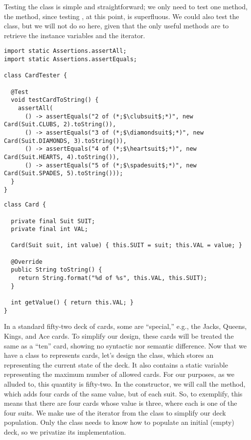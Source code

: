 Testing the  class is simple and straightforward; we only need to test one method, the  method, since testing , at this point, is superfluous. We could also test the  class, but we will not do so here, given that the only useful methods are to retrieve the instance variables and the iterator.

\begin{lstlisting}[language=MyJava]
import static Assertions.assertAll;
import static Assertions.assertEquals;

class CardTester {

  @Test
  void testCardToString() {
    assertAll(
      () -> assertEquals("2 of (*;$\clubsuit$;*)", new Card(Suit.CLUBS, 2).toString()),
      () -> assertEquals("3 of (*;$\diamondsuit$;*)", new Card(Suit.DIAMONDS, 3).toString()),
      () -> assertEquals("4 of (*;$\heartsuit$;*)", new Card(Suit.HEARTS, 4).toString()),
      () -> assertEquals("5 of (*;$\spadesuit$;*)", new Card(Suit.SPADES, 5).toString()));
  }
}
\end{lstlisting}

\begin{lstlisting}[language=MyJava]
class Card {

  private final Suit SUIT;
  private final int VAL;

  Card(Suit suit, int value) { this.SUIT = suit; this.VAL = value; }
  
  @Override
  public String toString() { 
    return String.format("%d of %s", this.VAL, this.SUIT); 
  }

  int getValue() { return this.VAL; } 
}
\end{lstlisting}

In a standard fifty-two deck of cards, some are ``special,'' e.g., the Jacks, Queens, Kings, and Ace cards. To simplify our design, these cards will be treated the same as a ``ten'' card, showing no syntactic nor semantic difference. Now that we have a class to represents cards, let's design the  class, which stores an  representing the current state of the deck. It also contains a static variable representing the maximum number of allowed cards. For our purposes, as we alluded to, this quantity is fifty-two. In the  constructor, we will call the  method, which adds four cards of the same value, but of each suit. So, to exemplify, this means that there are four cards whose value is three, where each is one of the four suits. We make use of the iterator from the  class to simplify our deck population. Only the  class needs to know how to populate an initial (empty) deck, so we privatize its implementation.

